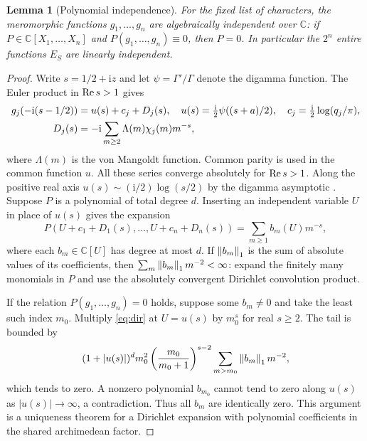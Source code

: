 \documentclass[11pt]{article}
\newtheorem{lemma}[theorem]{Lemma}
\theoremstyle{definition}\newtheorem{definition}[theorem]{Definition}
\newcommand{\C}{\mathbb C}\newcommand{\R}{\mathbb R}\newcommand{\N}{\mathbb N}
\newcommand{\ii}{\mathrm i}\newcommand{\diag}{\operatorname{diag}}
\begin{document}
\begin{lemma}[Polynomial independence]\label{lem:indep}
For the fixed list of characters, the meromorphic functions $g_1,\ldots,g_n$ are algebraically independent over $\C$: if $P\in\C[X_1,\ldots,X_n]$ and $P(g_1,\ldots,g_n)\equiv0$, then $P=0$. In particular the $2^n$ entire functions $E_S$ are linearly independent.
\end{lemma}
\begin{proof}
Write $s=1/2+\ii z$ and let $\psi=\Gamma'/\Gamma$ denote the digamma function. The Euler product in $\operatorname{Re} s>1$ gives
\begin{align}
 g_j(-\ii(s-1/2))&=u(s)+c_j+D_j(s),\label{eq:g}\quad
 u(s)=\tfrac{\ii}{2}\psi((s+a)/2),\quad c_j=\tfrac{\ii}{2}\log(q_j/\pi),\notag\\
 D_j(s)&=-\ii\sum_{m\ge2}\Lambda(m)\chi_j(m)m^{-s},\notag
\end{align}
where $\Lambda(m)$ is the von Mangoldt function. Common parity is used in the common function $u$. All these series converge absolutely for $\operatorname{Re} s>1$. Along the positive real axis $u(s)\sim(\ii/2)\log(s/2)$ by the digamma asymptotic \cite{dlmf}. Suppose $P$ is a polynomial of total degree $d$. Inserting an independent variable $U$ in place of $u(s)$ gives the expansion
\begin{equation}\label{eq:dir}
 P(U+c_1+D_1(s),\ldots,U+c_n+D_n(s))=\sum_{m\ge1}b_m(U)m^{-s},
\end{equation}
where each $b_m\in\C[U]$ has degree at most $d$. If $\left\|b_m\right\|_1$ is the sum of absolute values of its coefficients, then
$\sum_m\left\|b_m\right\|_1m^{-2}<\infty$: expand the finitely many monomials in $P$ and use the absolutely convergent Dirichlet convolution product.

If the relation $P(g_1,\ldots,g_n)=0$ holds, suppose some $b_m\ne0$ and take the least such index $m_0$. Multiply \eqref{eq:dir} at $U=u(s)$ by $m_0^s$ for real $s\ge2$. The tail is bounded by
\[
 (1+|u(s)|)^d m_0^2\left(\frac{m_0}{m_0+1}\right)^{s-2}
       \sum_{m>m_0}\left\|b_m\right\|_1m^{-2},
\]
which tends to zero. A nonzero polynomial $b_{m_0}$ cannot tend to zero along $u(s)$ as $|u(s)|\to\infty$, a contradiction. Thus all $b_m$ are identically zero. This argument is a uniqueness theorem for a Dirichlet expansion with polynomial coefficients in the shared archimedean factor.


\end{proof}
\end{document}
